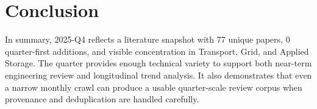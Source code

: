 \documentclass[conference]{IEEEtran}
\begin{document}
\section{Conclusion}
In summary, 2025-Q4 reflects a literature snapshot with 77 unique papers, 0 quarter-first additions, and visible concentration in Transport, Grid, and Applied Storage. The quarter provides enough technical variety to support both near-term engineering review and longitudinal trend analysis. It also demonstrates that even a narrow monthly crawl can produce a usable quarter-scale review corpus when provenance and deduplication are handled carefully.



\end{document}
